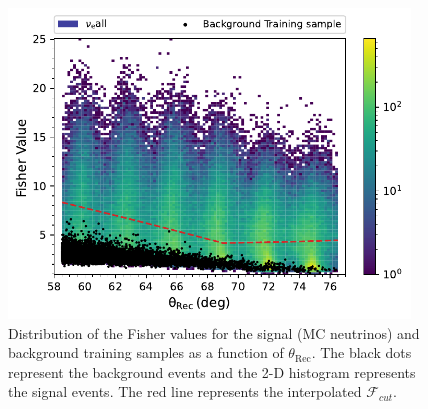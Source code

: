 \begin{figure}[h!]
  \centering
  \includegraphics[width=0.95\textwidth]{thesis_figures/Nu_analysis/Fisher_plots/Fisher_comp_bkg_sim_wnt.pdf}
  \caption{Distribution of the Fisher values for the signal (MC neutrinos) and background training samples as a function of $\theta_{\text{Rec}}$. The black dots represent the background events and the 2-D histogram represents the signal events. The red line represents the interpolated $\mathcal{F}_{cut}$.}
  \label{fig:Fish_bkg_sig}
\end{figure}



